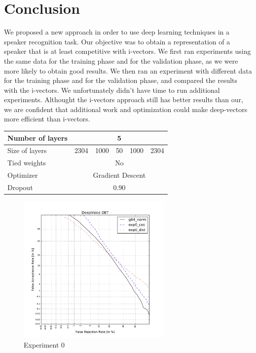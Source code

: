 \documentclass[conference]{IEEEtran}
\begin{document}
\section{Conclusion}

We proposed a new approach in order to use deep learning techniques in a speaker recognition task.
Our objective was to obtain a representation of a speaker that is at least competitive with i-vectors.
We first ran experiments using the same data for the training phase and for the validation phase, as we were more likely to obtain good results. We then ran an experiment with different data for the training phase and for the validation phase, and compared the results with the i-vectors. We unfortunately didn't have time to run additional experiments. Althought the i-vectors approach still has better results than our, we are confident that additional work and optimization could make deep-vectors more efficient than i-vectors.

\newpage
\printbibliography

\newpage

\appendix

\begin{table}[!h]
\centering
\begin{tabular}{|l|c|c|c|c|c|}
\hline
Number of layers & \multicolumn{5}{c|}{5}                \\ \hline
Size of layers   & 2304   & 1000   & 50  & 1000  & 2304  \\ \hline
Tied weights     & \multicolumn{5}{c|}{No}               \\ \hline
Optimizer        & \multicolumn{5}{c|}{Gradient Descent} \\ \hline
Dropout          & \multicolumn{5}{c|}{0.90} \\ \hline
\end{tabular}
\end{table}

\begin{figure}[!h]
    \centering
    \includegraphics[width=7.5cm]{../scores/det0.pdf}
    \captionsetup{labelformat=empty}
    \caption{Experiment 0}
\end{figure}
\end{document}
